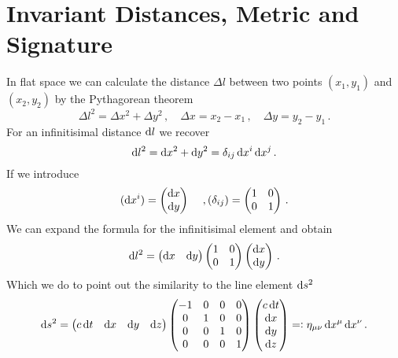 \section{Invariant Distances, Metric and Signature}
In flat space we can calculate the distance $\Delta l$ between two points
$(x_1,y_1)$ and $(x_2,y_2)$ by the Pythagorean theorem
\begin{equation}
\Delta l^2=\Delta x^2+\Delta y^2\, ,
\quad \Delta x=x_2-x_1\,,\quad \Delta
y=y_2-y_1\, .
\end{equation}
For an infinitisimal distance $\dif l$ we recover
\begin{equation}
\dif l^2=\dif x^2+\dif y^2=\delta_{ij}\dif x^i\dif x^j\, .
\end{equation}
If we introduce
\begin{equation}
(\dif x^i)=\begin{pmatrix}
\dif x\\
\dif y
\end{pmatrix}\,\quad ,(\delta_{ij})=\begin{pmatrix}
1 & 0\\
0 & 1
\end{pmatrix}\, .
\end{equation}
We can expand the formula for the infinitisimal element and obtain
\begin{equation}
\dif l^2=\begin{pmatrix}
\dif x & 
\dif y
\end{pmatrix}
\begin{pmatrix}
1 & 0\\
0 & 1
\end{pmatrix}
\begin{pmatrix}
\dif x\\
\dif y
\end{pmatrix}\, .
\end{equation}
Which we do to point out the similarity to the line element $\dif s^2$
\begin{equation}
\dif s^2=\begin{pmatrix}
c\dif t & 
\dif x & 
\dif y &
\dif z 
\end{pmatrix}
\begin{pmatrix}
-1 & 0 & 0 & 0\\
0  & 1 & 0 & 0\\
0  & 0 & 1 & 0\\
0  & 0 & 0 & 1\\
\end{pmatrix}
\begin{pmatrix}
c\dif t\\
\dif x\\
\dif y\\
\dif z\\
\end{pmatrix}=:\eta_{\mu\nu}\dif x^\mu\dif x^\nu\, .
\end{equation}
